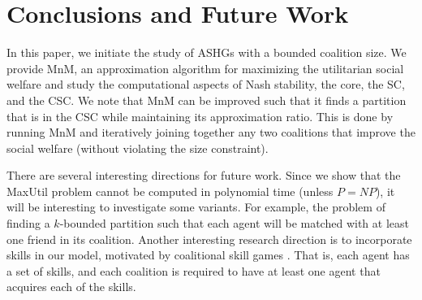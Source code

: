\documentclass[sigconf,anonymous]{aamas}
\begin{document}
\section{Conclusions and Future Work}
In this paper, we initiate the study of ASHGs with a bounded coalition size. We provide MnM, an approximation algorithm for maximizing the utilitarian social welfare and study the computational aspects of Nash stability, the core, the SC, and the CSC. 
We note that MnM can be improved such that it finds a partition that is in the CSC while maintaining its approximation ratio. This is done by running MnM and iteratively joining together any two coalitions that improve the social welfare (without violating the size constraint).

There are several interesting directions for future work. 
Since we show that the MaxUtil problem cannot be computed in polynomial time (unless $P=NP$), it will be interesting to investigate some variants. For example, the problem of finding a $k$-bounded partition such that each agent will be matched with at least one friend in its coalition.
%
Another interesting research direction is to incorporate skills in our model, motivated by coalitional skill games \cite{bachrach2008coalitional}. That is, each agent has a set of skills, and each coalition is required to have at least one agent that acquires each of the skills.
\end{document}
